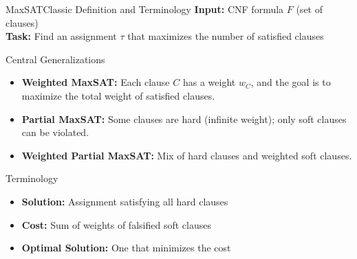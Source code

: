 \documentclass[t,english]{sdqbeamer}
\begin{document}
\begin{frame}{MaxSAT}{Classic Definition and Terminology}
\textbf{Input:} CNF formula $F$ (set of clauses)\\
\textbf{Task:} Find an assignment $\tau$ that maximizes the number of satisfied clauses\\[1ex]
\begin{block}{Central Generalizations}
\begin{itemize}
	\item \textbf{Weighted MaxSAT:} Each clause $C$ has a weight $w_C$, and the goal is to maximize the total weight of satisfied clauses.
	\item \textbf{Partial MaxSAT:} Some clauses are hard (infinite weight); only soft clauses can be violated.
	\item \textbf{Weighted Partial MaxSAT:} Mix of hard clauses and weighted soft clauses.
\end{itemize}
\end{block}
\begin{block}{Terminology}
\begin{itemize}
	\item \textbf{Solution:} Assignment satisfying all hard clauses
	\item \textbf{Cost:} Sum of weights of falsified soft clauses
	\item \textbf{Optimal Solution:} One that minimizes the cost
\end{itemize}
\end{block}
\end{frame}
\end{document}
